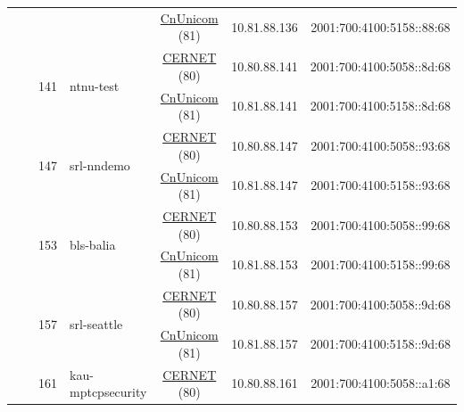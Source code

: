 \begin{small}
\begin{center}
\begin{longtable}{|c|c|c|c|c|c|c|c|}
  &  &  &  & \multicolumn{2}{|c|}{\tiny{\href{http://www.chinaunicom.com}{CnUnicom} (81)}} & \tiny{10.81.88.136} & \tiny{2001:700:4100:5158::88:68} \\* \cline{3-3}\cline{4-4}\cline{5-5}\cline{6-6}\cline{7-7}\cline{8-8}
  &  & \multirow{2}{*}{\tiny{141}} & \multicolumn{1}{|l|}{\multirow{2}{*}{\tiny{ntnu-test}}} & \multicolumn{2}{|c|}{\tiny{\href{http://www.cernet.edu.cn}{CERNET} (80)}} & \tiny{10.80.88.141} & \tiny{2001:700:4100:5058::8d:68} \\* \cline{5-5}\cline{6-6}\cline{7-7}\cline{8-8}
  &  &  &  & \multicolumn{2}{|c|}{\tiny{\href{http://www.chinaunicom.com}{CnUnicom} (81)}} & \tiny{10.81.88.141} & \tiny{2001:700:4100:5158::8d:68} \\* \cline{3-3}\cline{4-4}\cline{5-5}\cline{6-6}\cline{7-7}\cline{8-8}
  &  & \multirow{2}{*}{\tiny{147}} & \multicolumn{1}{|l|}{\multirow{2}{*}{\tiny{srl-nndemo}}} & \multicolumn{2}{|c|}{\tiny{\href{http://www.cernet.edu.cn}{CERNET} (80)}} & \tiny{10.80.88.147} & \tiny{2001:700:4100:5058::93:68} \\* \cline{5-5}\cline{6-6}\cline{7-7}\cline{8-8}
  &  &  &  & \multicolumn{2}{|c|}{\tiny{\href{http://www.chinaunicom.com}{CnUnicom} (81)}} & \tiny{10.81.88.147} & \tiny{2001:700:4100:5158::93:68} \\* \cline{3-3}\cline{4-4}\cline{5-5}\cline{6-6}\cline{7-7}\cline{8-8}
  &  & \multirow{2}{*}{\tiny{153}} & \multicolumn{1}{|l|}{\multirow{2}{*}{\tiny{bls-balia}}} & \multicolumn{2}{|c|}{\tiny{\href{http://www.cernet.edu.cn}{CERNET} (80)}} & \tiny{10.80.88.153} & \tiny{2001:700:4100:5058::99:68} \\* \cline{5-5}\cline{6-6}\cline{7-7}\cline{8-8}
  &  &  &  & \multicolumn{2}{|c|}{\tiny{\href{http://www.chinaunicom.com}{CnUnicom} (81)}} & \tiny{10.81.88.153} & \tiny{2001:700:4100:5158::99:68} \\* \cline{3-3}\cline{4-4}\cline{5-5}\cline{6-6}\cline{7-7}\cline{8-8}
  &  & \multirow{2}{*}{\tiny{157}} & \multicolumn{1}{|l|}{\multirow{2}{*}{\tiny{srl-seattle}}} & \multicolumn{2}{|c|}{\tiny{\href{http://www.cernet.edu.cn}{CERNET} (80)}} & \tiny{10.80.88.157} & \tiny{2001:700:4100:5058::9d:68} \\* \cline{5-5}\cline{6-6}\cline{7-7}\cline{8-8}
  &  &  &  & \multicolumn{2}{|c|}{\tiny{\href{http://www.chinaunicom.com}{CnUnicom} (81)}} & \tiny{10.81.88.157} & \tiny{2001:700:4100:5158::9d:68} \\* \cline{3-3}\cline{4-4}\cline{5-5}\cline{6-6}\cline{7-7}\cline{8-8}
  &  & \multirow{2}{*}{\tiny{161}} & \multicolumn{1}{|l|}{\multirow{2}{*}{\tiny{kau-mptcpsecurity}}} & \multicolumn{2}{|c|}{\tiny{\href{http://www.cernet.edu.cn}{CERNET} (80)}} & \tiny{10.80.88.161} & \tiny{2001:700:4100:5058::a1:68} \\* \cline{5-5}\cline{6-6}\cline{7-7}\cline{8-8}

\end{longtable}
\end{center}
\end{small}
